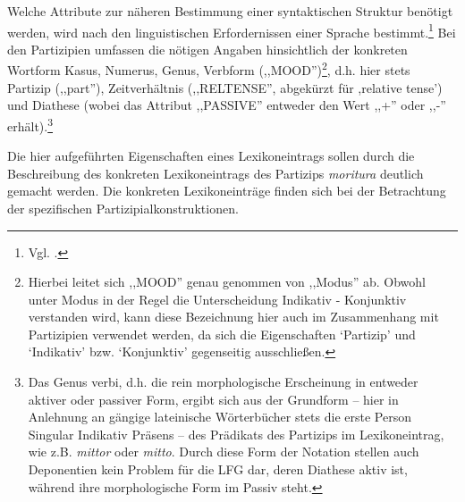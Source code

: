 \documentclass[12pt,a4paper]{article}
\begin{document}
Welche Attribute zur näheren Bestimmung einer syntaktischen Struktur benötigt werden, wird nach den linguistischen Erfordernissen einer Sprache bestimmt.\footnote{Vgl. \cite[8]{Skript}.} Bei den Partizipien umfassen die nötigen Angaben hinsichtlich der konkreten Wortform Kasus, Numerus, Genus, Verbform (,,MOOD'')\footnote{Hierbei leitet sich ,,MOOD'' genau genommen von ,,Modus'' ab. Obwohl unter Modus in der Regel die Unterscheidung Indikativ - Konjunktiv verstanden wird, kann diese Bezeichnung hier auch im Zusammenhang mit Partizipien verwendet werden, da sich die Eigenschaften `Partizip' und `Indikativ' bzw. `Konjunktiv' gegenseitig ausschließen.}, d.h. hier stets Partizip (,,part''), Zeitverhältnis (,,RELTENSE'', abgekürzt für ,relative tense') und Diathese (wobei das Attribut ,,PASSIVE'' entweder den Wert ,,+'' oder ,,-'' erhält).\footnote{Das Genus verbi, d.h. die rein morphologische Erscheinung in entweder aktiver oder passiver Form, ergibt sich aus der Grundform -- hier in Anlehnung an gängige lateinische Wörterbücher stets die erste Person Singular Indikativ Präsens -- des Prädikats des Partizips im Lexikoneintrag, wie z.B. \textit{mittor} oder \textit{mitto}. Durch diese Form der Notation stellen auch Deponentien kein Problem für die LFG dar, deren Diathese aktiv ist, während ihre morphologische Form im Passiv steht.}

Die hier aufgeführten Eigenschaften eines Lexikoneintrags sollen durch die Beschreibung des konkreten Lexikoneintrags des Partizips \textit{moritura} deutlich gemacht werden. Die konkreten Lexikoneinträge finden sich bei der Betrachtung der spezifischen Partizipialkonstruktionen.
\end{document}
